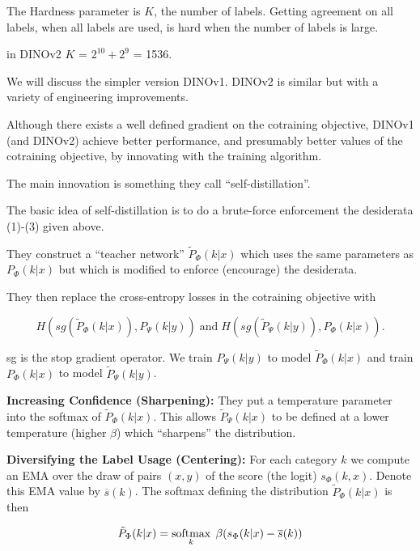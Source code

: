 {{\vfill
The Hardness parameter is $K$, the number of labels.  Getting agreement on all labels, when all labels are used, is hard when the number of labels is large.

\vfill
in DINOv2 $K$ = $2^{10} + 2^9$ = 1536.


We will discuss the simpler version DINOv1. DINOv2 is similar but with a variety of engineering improvements.

\vfill
Although there exists a well defined gradient on the cotraining objective, DINOv1 (and DINOv2) achieve better performance, and presumably better values of the cotraining objective, by innovating with the training algorithm.

\vfill
The main innovation is something they call ``self-distillation''.

\vfill
The basic idea of self-distillation is to do a brute-force enforcement the desiderata (1)-(3) given above.


They construct a ``teacher network'' $\tilde{P}_\Phi(k|x)$ which uses the same parameters as $P_\Phi(k|x)$ but which is modified to enforce
(encourage) the desiderata.

\vfill
They then replace the cross-entropy losses in the cotraining objective with

$$H(sg(\tilde{P}_\Phi(k|x)),P_\Psi(k|y))\;\mbox{and}\;H(sg(\tilde{P}_\Psi(k|y)),P_\Phi(k|x)).$$

\vfill
sg is the stop gradient operator. We train $P_\Psi(k|y)$ to model $\tilde{P}_\Phi(k|x)$
and train $P_\Phi(k|x)$ to model $\tilde{P}_\Psi(k|y)$.



\vfill
{\bf Increasing Confidence (Sharpening):} They put a temperature parameter into the softmax of $\tilde{P}_\Phi(k|x)$.
This allows $\tilde{P}_\Psi(k|x)$ to be defined at a lower temperature (higher $\beta$) which ``sharpens'' the distribution.

\vfill
{\bf Diversifying the Label Usage (Centering):} For each category $k$ we compute an EMA over the draw of pairs $(x,y)$ of the
score (the logit) $s_\Phi(k,x)$.  Denote this EMA value by $\overline{s}(k)$.  The softmax defining the distribution $\tilde{P}_\Phi(k|x)$ is then

$$\tilde{P}_\Phi(k|x) = \operatorname*{softmax}_k\;\beta(s_\Phi(k|x) - \overline{s}(k))$$


}}
